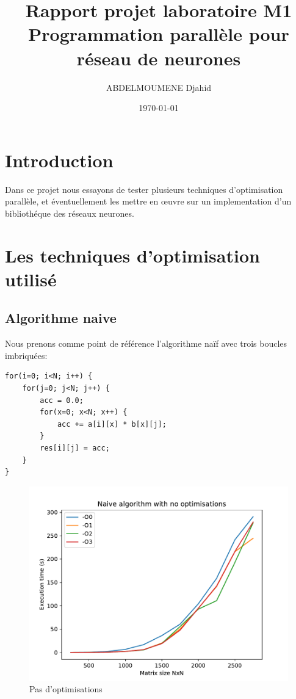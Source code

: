 \documentclass {article}
\title{Rapport projet laboratoire M1\\
Programmation parallèle pour réseau de neurones }
\date{\today}
\author{ABDELMOUMENE Djahid}
\begin{document}
\maketitle
\newpage


\section{Introduction}
Dans ce projet nous essayons de tester plusieurs techniques d'optimisation parallèle, et éventuellement les mettre en œuvre sur un implementation d'un bibliothéque des réseaux neurones.

\section{Les techniques d'optimisation utilisé}
\subsection{Algorithme naive}
Nous prenons comme point de référence l'algorithme naïf avec trois boucles imbriquées:

\begin{lstlisting}
for(i=0; i<N; i++) {
    for(j=0; j<N; j++) { 
        acc = 0.0;
        for(x=0; x<N; x++) {
            acc += a[i][x] * b[x][j];
        }
        res[i][j] = acc;
    }
}
\end{lstlisting}


\begin{figure}[H]
    \includegraphics[width=\linewidth]{plot/no_opt.pdf}
    \caption{Pas d'optimisations}
    \label{fig:no_opt}
\end{figure}
\end{document}
